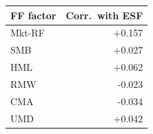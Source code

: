 \begin{tabular}{lr}
\toprule
FF factor & Corr.\ with ESF \\
\midrule
Mkt-RF & +0.157 \\
SMB & +0.027 \\
HML & +0.062 \\
RMW & -0.023 \\
CMA & -0.034 \\
UMD & +0.042 \\
\bottomrule
\end{tabular}